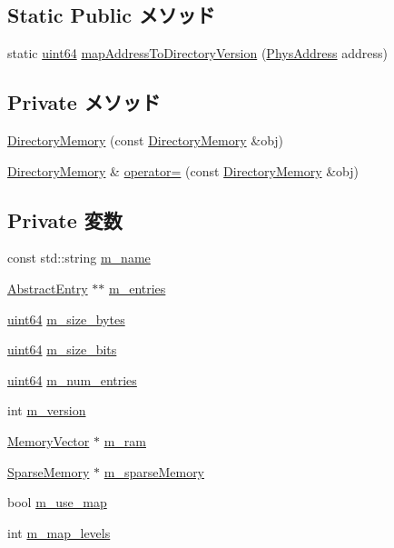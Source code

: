 \subsection*{Static Public メソッド}
\begin{DoxyCompactItemize}
\item 
static \hyperlink{TypeDefines_8hh_a29940ae63ec06c9998bba873e25407ad}{uint64} \hyperlink{classDirectoryMemory_a9bae36eed835f1fd18280e5e438d4a00}{mapAddressToDirectoryVersion} (\hyperlink{classAddress}{PhysAddress} address)
\end{DoxyCompactItemize}
\subsection*{Private メソッド}
\begin{DoxyCompactItemize}
\item 
\hyperlink{classDirectoryMemory_ae2327b46bc88514a99866373c87dfbdf}{DirectoryMemory} (const \hyperlink{classDirectoryMemory}{DirectoryMemory} \&obj)
\item 
\hyperlink{classDirectoryMemory}{DirectoryMemory} \& \hyperlink{classDirectoryMemory_a6879b807bfd1fc1e7bc5d04d725e460d}{operator=} (const \hyperlink{classDirectoryMemory}{DirectoryMemory} \&obj)
\end{DoxyCompactItemize}
\subsection*{Private 変数}
\begin{DoxyCompactItemize}
\item 
const std::string \hyperlink{classDirectoryMemory_a6f9e296fcf5c68222c08850e8279025e}{m\_\-name}
\item 
\hyperlink{classAbstractEntry}{AbstractEntry} $\ast$$\ast$ \hyperlink{classDirectoryMemory_a41aa76007a4ddaccff55c0f28ac3be52}{m\_\-entries}
\item 
\hyperlink{TypeDefines_8hh_a29940ae63ec06c9998bba873e25407ad}{uint64} \hyperlink{classDirectoryMemory_a6afc0c2ed72f763bda77186326c71f69}{m\_\-size\_\-bytes}
\item 
\hyperlink{TypeDefines_8hh_a29940ae63ec06c9998bba873e25407ad}{uint64} \hyperlink{classDirectoryMemory_a9a7f68c948dadfcef55a94104332cb26}{m\_\-size\_\-bits}
\item 
\hyperlink{TypeDefines_8hh_a29940ae63ec06c9998bba873e25407ad}{uint64} \hyperlink{classDirectoryMemory_a0b2cd791bb1adfe164c17cd3f15a1edf}{m\_\-num\_\-entries}
\item 
int \hyperlink{classDirectoryMemory_aae89efc34a31c6494fec8420499645d2}{m\_\-version}
\item 
\hyperlink{classMemoryVector}{MemoryVector} $\ast$ \hyperlink{classDirectoryMemory_a038fb43be8a26f6f78ed3b93e31e9a11}{m\_\-ram}
\item 
\hyperlink{classSparseMemory}{SparseMemory} $\ast$ \hyperlink{classDirectoryMemory_ac2e95b091df9faed68e3ba36da4f07d7}{m\_\-sparseMemory}
\item 
bool \hyperlink{classDirectoryMemory_a3729647a2abfdccf300a0b573c20f7c9}{m\_\-use\_\-map}
\item 
int \hyperlink{classDirectoryMemory_afb4c3242bdb5ece61bf01362d497d905}{m\_\-map\_\-levels}
\end{DoxyCompactItemize}
